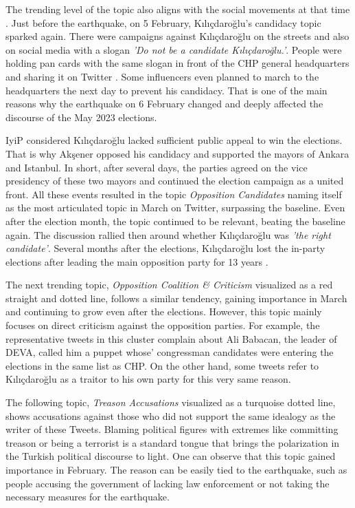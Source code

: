The trending level of the topic also aligns with the social movements at that time 
\parencite{gultekin_kilicdaroglu_aday_2023}. 
Just before the earthquake, on 5 February, Kılıçdaroğlu's candidacy topic sparked again. 
There were campaigns against Kılıçdaroğlu on the streets and also on social media with a slogan 
\textit{'Do not be a candidate Kılıçdaroğlu.'}. People were holding pan cards with the same slogan 
in front of the \ac{CHP} general headquarters and sharing it on Twitter \parencite{ulas_kilicdaroglu_aday_pankart_2023}. 
Some influencers even planned to march to the headquarters the next day to prevent his candidacy. 
That is one of the main reasons why the earthquake on 6 February changed and deeply affected 
the discourse of the May 2023 elections.

\ac{IyiP} considered Kılıçdaroğlu lacked sufficient public appeal to win the elections. 
That is why Akşener opposed his candidacy and supported the mayors of Ankara and Istanbul. 
In short, after several days, the parties agreed on the vice presidency of these two mayors and 
continued the election campaign as a united front. All these events resulted in the topic 
\textit{Opposition Candidates} naming itself as the most articulated topic in March on Twitter, 
surpassing the baseline. Even after the election month, the topic continued to be relevant, 
beating the baseline again. The discussion rallied then around whether Kılıçdaroğlu was 
\textit{'the right candidate'}. Several months after the elections, Kılıçdaroğlu lost the in-party 
elections after leading the main opposition party for 13 years \parencite{gundogan_chp_özgür_özel_2023}.


The next trending topic, \textit{Opposition Coalition \& Criticism} visualized as a red straight 
and dotted line, follows a similar tendency, gaining importance in March and continuing to 
grow even after the elections. However, this topic mainly focuses on direct criticism against 
the opposition parties. For example, the representative tweets in this cluster complain about 
Ali Babacan, the leader of \ac{DEVA}, called him a puppet whose' congressman candidates were 
entering the elections in the same list as \ac{CHP}. On the other hand, some tweets refer to 
Kılıçdaroğlu as a traitor to his own party for this very same reason.

The following topic, \textit{Treason Accusations} visualized as a turquoise dotted line, shows 
accusations against those who did not support the same idealogy as the writer of these Tweets. 
Blaming political figures with extremes like committing treason or being a terrorist is a standard 
tongue that brings the polarization in the Turkish political discourse to light. 
One can observe that this topic gained importance in February. 
The reason can be easily tied to the earthquake, such as people accusing the government of lacking 
law enforcement or not taking the necessary measures for the earthquake.


